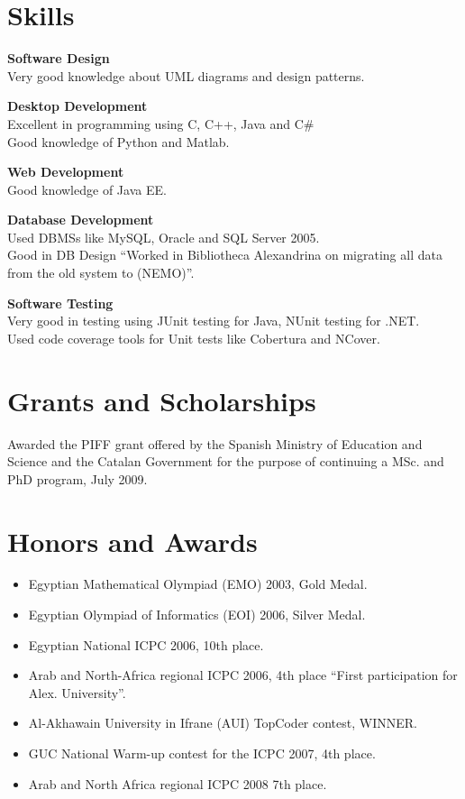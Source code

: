 \documentclass{res}
\begin{document}
\begin{resume}
\section{Skills}
    {\bf Software Design}\\
    Very good knowledge about UML diagrams and design patterns.

    {\bf Desktop Development}\\
    Excellent in programming using C, C++, Java and C\#\\
    Good knowledge of Python and Matlab.

    {\bf Web Development}\\
    Good knowledge of Java EE.

    {\bf Database Development}\\
    Used DBMSs like MySQL, Oracle and SQL Server 2005.\\
    Good in DB Design ``Worked in Bibliotheca Alexandrina on migrating all data from the old system to (NEMO)''.

    {\bf Software Testing}\\
    Very good in testing using JUnit testing for Java, NUnit testing for .NET.\\
    Used code coverage tools for Unit tests like Cobertura and NCover.
 
\section{Grants and Scholarships}

Awarded the PIFF grant offered by the Spanish Ministry of Education and Science and the Catalan Government for the purpose of continuing a
MSc. and PhD program, July 2009.

\section{Honors and Awards}
    \begin{itemize}
    \item Egyptian Mathematical Olympiad (EMO) 2003, Gold Medal.
    \item Egyptian Olympiad of Informatics (EOI) 2006, Silver Medal.
    \item Egyptian National ICPC 2006, 10th place.
    \item Arab and North-Africa regional ICPC 2006, 4th place “First participation for Alex. University”.
    \item Al-Akhawain University in Ifrane (AUI) TopCoder contest, WINNER.
    \item GUC National Warm-up contest for the ICPC 2007, 4th place.
    \item Arab and North Africa regional ICPC 2008 7th place.
    \end{itemize}
 

\end{resume}
\end{document}
